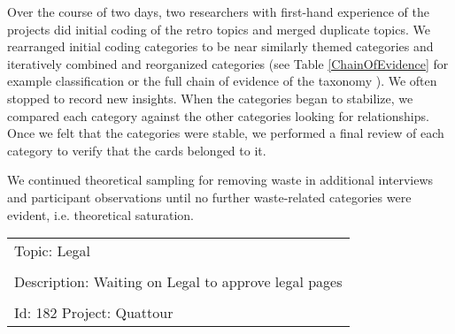 Over the course of two days, two researchers with first-hand experience of the projects did initial coding of the retro topics and merged duplicate topics. We rearranged initial coding categories to be near similarly themed categories and iteratively combined and reorganized categories (see Table \ref{ChainOfEvidence} for example classification or the full chain of evidence of the taxonomy \cite{SedanoDissertation}). We often stopped to record new insights. When the categories began to stabilize, we compared each category against the other categories looking for relationships. Once we felt that the categories were stable, we performed a final review of each category to verify that the cards belonged to it. 

We continued theoretical sampling for removing waste in additional interviews and participant observations until no further waste-related categories were evident, i.e. theoretical saturation. 


\begin{table}[t]
\renewcommand{\arraystretch}{1.5}
\centering
{}
\label{exampleRetroTopicl}
\begin{tabular}{|l|}
\hline
Topic: Legal \\ \\ Description: Waiting on Legal to approve legal pages \\ \\ Id: 182 Project: Quattour\\ \hline
\end{tabular}
\end{table}








